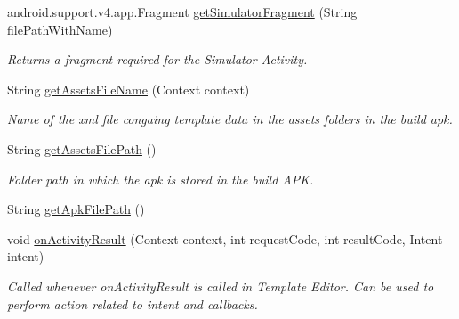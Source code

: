 \begin{DoxyCompactItemize}
\item 
android.\+support.\+v4.\+app.\+Fragment \hyperlink{classorg_1_1buildmlearn_1_1toolkit_1_1templates_1_1FlashTemplate_a36f3970e28dded3330ad192b418d3750}{get\+Simulator\+Fragment} (String file\+Path\+With\+Name)
\begin{DoxyCompactList}\small\item\em Returns a fragment required for the Simulator Activity. \end{DoxyCompactList}\item 
String \hyperlink{classorg_1_1buildmlearn_1_1toolkit_1_1templates_1_1FlashTemplate_a4ddbf3cfd4aaa7a991e73e257d7423d0}{get\+Assets\+File\+Name} (Context context)
\begin{DoxyCompactList}\small\item\em Name of the xml file congaing template data in the assets folders in the build apk. \end{DoxyCompactList}\item 
String \hyperlink{classorg_1_1buildmlearn_1_1toolkit_1_1templates_1_1FlashTemplate_a081b149001c8d3829f6d5e81e0b80113}{get\+Assets\+File\+Path} ()
\begin{DoxyCompactList}\small\item\em Folder path in which the apk is stored in the build A\+PK. \end{DoxyCompactList}\item 
String \hyperlink{classorg_1_1buildmlearn_1_1toolkit_1_1templates_1_1FlashTemplate_ae0ed657e20c9619afcd89bd624deb888}{get\+Apk\+File\+Path} ()
\item 
void \hyperlink{classorg_1_1buildmlearn_1_1toolkit_1_1templates_1_1FlashTemplate_a94a03d343059afa3914559725d911818}{on\+Activity\+Result} (Context context, int request\+Code, int result\+Code, Intent intent)
\begin{DoxyCompactList}\small\item\em Called whenever on\+Activity\+Result is called in Template Editor. Can be used to perform action related to intent and callbacks. \end{DoxyCompactList}\end{DoxyCompactItemize}
